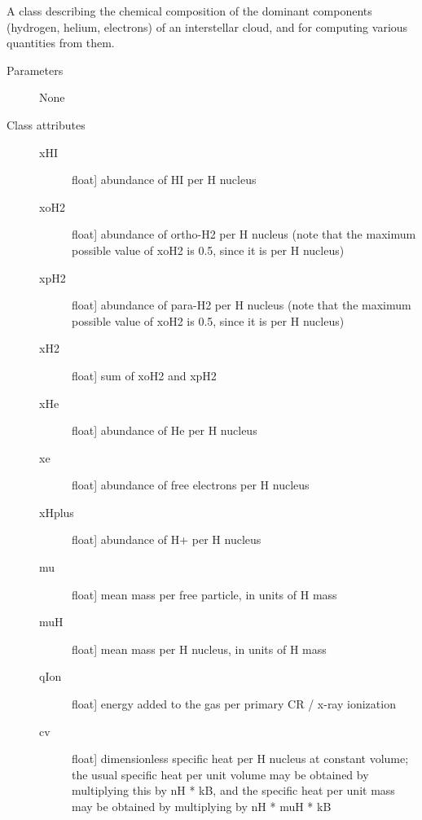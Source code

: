 \documentclass[letterpaper,10pt,english]{sphinxmanual}
\begin{document}
\begin{fulllineitems}
\label{fulldoc:despotic.composition}
A class describing the chemical composition of the dominant
components (hydrogen, helium, electrons) of an interstellar cloud,
and for computing various quantities from them.
\begin{description}
\item[{Parameters}] \leavevmode
None

\item[{Class attributes}] \leavevmode\begin{description}
\item[{xHI}] \leavevmode{[}float{]}
abundance of HI per H nucleus

\item[{xoH2}] \leavevmode{[}float{]}
abundance of ortho-H2 per H nucleus (note that the maximum
possible value of xoH2 is 0.5, since it is per H nucleus)

\item[{xpH2}] \leavevmode{[}float{]}
abundance of para-H2 per H nucleus  (note that the maximum
possible value of xoH2 is 0.5, since it is per H nucleus)

\item[{xH2}] \leavevmode{[}float{]}
sum of xoH2 and xpH2

\item[{xHe}] \leavevmode{[}float{]}
abundance of He per H nucleus

\item[{xe}] \leavevmode{[}float{]}
abundance of free electrons per H nucleus

\item[{xHplus}] \leavevmode{[}float{]}
abundance of H+ per H nucleus

\item[{mu}] \leavevmode{[}float{]}
mean mass per free particle, in units of H mass

\item[{muH}] \leavevmode{[}float{]}
mean mass per H nucleus, in units of H mass

\item[{qIon}] \leavevmode{[}float{]}
energy added to the gas per primary CR / x-ray ionization

\item[{cv}] \leavevmode{[}float{]}
dimensionless specific heat per H nucleus at constant volume;
the usual specific heat per unit volume may be obtained by
multiplying this by nH * kB, and the specific heat per unit
mass may be obtained by multiplying by nH * muH * kB


\end{description}
\end{description}
\end{fulllineitems}
\end{document}
